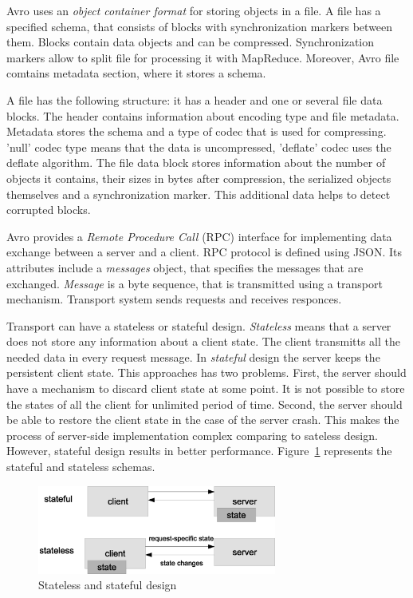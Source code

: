 Avro uses an \textit{object container format} for storing objects in a file.
A file has a specified schema, that consists of blocks with synchronization markers between them.
Blocks contain data objects and can be compressed.
Synchronization markers allow to split file for processing it with MapReduce.
Moreover, Avro file comtains metadata section, where it stores a schema.

A file has the following structure: it has a header and one or several file data blocks.
The header contains information about encoding type and file metadata.
Metadata stores the schema and a type of codec that is used for compressing.
'null' codec type means that the data is uncompressed, 'deflate' codec uses the deflate algorithm.
The file data block stores information about the number of objects it contains, their sizes in bytes after compression, the serialized objects themselves and a synchronization marker.
This additional data helps to detect corrupted blocks.

Avro provides a \textit{Remote Procedure Call} (RPC) interface for implementing data exchange between a server and a client.
RPC protocol is defined using JSON.
Its attributes include a \textit{messages} object, that specifies the messages that are exchanged.  
\textit{Message} is a byte sequence, that is transmitted using a transport mechanism.
Transport system sends requests and receives responces.

Transport can have a stateless or stateful design.
\textit{Stateless} means that a server does not store any information about a client state.
The client transmitts all the needed data in every request message.
In \textit{stateful} design the server keeps the persistent client state.
This approaches has two problems.
First, the server should have a mechanism to discard client state at some point.
It is not possible to store the states of all the client for unlimited period of time.
Second, the server should be able to restore the client state in the case of the server crash.
This makes the process of server-side implementation complex comparing to sateless design.
However, stateful design results in better performance.
Figure~\ref{fig:stateful_stateless} represents the stateful and stateless schemas.

\begin{figure}
  \centering
  \includegraphics [width=0.7\textwidth]{images/stateful_stateless}
  \caption{Stateless and stateful design}
  \label{fig:stateful_stateless}
\end{figure}

